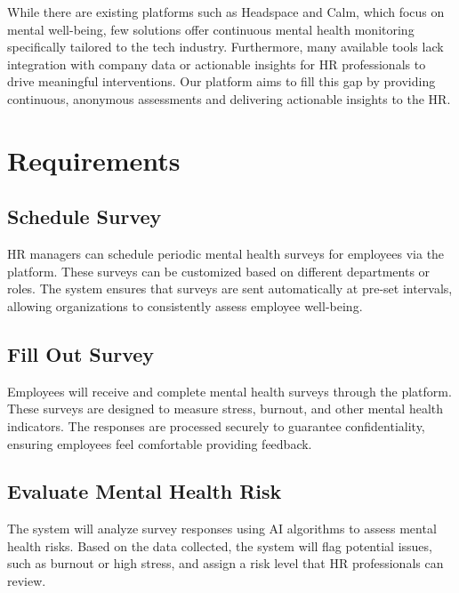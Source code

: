 \documentclass[conference]{IEEEtran}
\begin{document}
        While there are existing platforms such as Headspace and
        Calm, which focus on mental well-being, few solutions offer
        continuous mental health monitoring specifically tailored to
        the tech industry. Furthermore, many available tools lack
        integration with company data or actionable insights for HR
        professionals to drive meaningful interventions. Our platform
        aims to fill this gap by providing continuous, anonymous
        assessments and delivering actionable insights to the HR.
        \newline

    \section{Requirements}
        
        \subsection{Schedule Survey}
            
            HR managers can schedule periodic mental health surveys
            for employees via the platform. These surveys can be
            customized based on different departments or roles. The
            system ensures that surveys are sent automatically at pre-set
            intervals, allowing organizations to consistently assess
            employee well-being.
            
        \subsection{Fill Out Survey}
                
            Employees will receive and complete mental health
            surveys through the platform. These surveys are designed to
            measure stress, burnout, and other mental health indicators.
            The responses are processed securely to guarantee
            confidentiality, ensuring employees feel comfortable
            providing feedback.
            
        \subsection{Evaluate Mental Health Risk}
                
            The system will analyze survey responses using AI
            algorithms to assess mental health risks. Based on the data
            collected, the system will flag potential issues, such as burnout
            or high stress, and assign a risk level that HR professionals can
            review.
            
\end{document}
